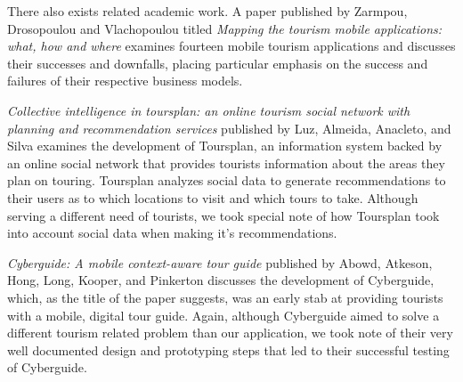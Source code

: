 \documentclass{sigchi}
\begin{document}
There also exists related academic work. A paper published by Zarmpou, Drosopoulou and Vlachopoulou titled \emph{Mapping the tourism mobile applications: what, how and where} \cite{Zarmpou:2013:MTM:2490257.2490295} examines fourteen mobile tourism applications and discusses their successes and downfalls, placing particular emphasis on the success and failures of their respective business models. 

\emph{Collective intelligence in toursplan: an online tourism social network with planning and recommendation services} published by Luz, Almeida, Anacleto, and Silva \cite{Luz:2013:CIT:2494444.2494449} examines the development of Toursplan, an information system backed by an online social network that provides tourists information about the areas they plan on touring. Toursplan analyzes social data to generate recommendations to their users as to which locations to visit and which tours to take. Although serving a different need of tourists, we took special note of how Toursplan took into account social data when making it's recommendations. 

\emph{Cyberguide: A mobile context-aware tour guide} published by Abowd, Atkeson, Hong, Long, Kooper, and Pinkerton \cite{Abowd:1997:CMC:272186.272199} discusses the development of Cyberguide, which, as the title of the paper suggests, was an early stab at providing tourists with a mobile, digital tour guide. Again, although Cyberguide aimed to solve a different tourism related problem than our application, we took note of their very well documented design and prototyping steps that led to their successful testing of Cyberguide.
\end{document}
